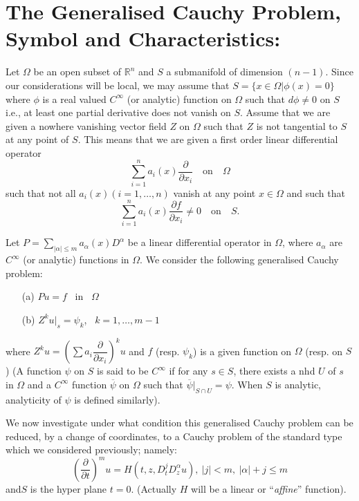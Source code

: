 \section*{The Generalised Cauchy Problem, Symbol and Characteristics:}\pageoriginale

Let $\Omega$ be an open subset of $\mathbb{R}^{n}$ and $S$ a submanifold of dimension $(n-1)$. Since our considerations will be local, we may assume that $S=\{x\in \Omega|\phi(x)=0\}$ where $\phi$ is a real valued $C^{\infty}$ (or analytic) function on $\Omega$ such that $d\phi \neq 0$ on $S$ i.e., at least one partial derivative does not vanish on $S$. Assume that we are given a nowhere vanishing vector field $Z$ on $\Omega$ such that $Z$ is not tangential to $S$ at any point of $S$. This means that we are given a first order linear differential operator
$$
\sum\limits^{n}_{i=1}a_{i}(x)\frac{\partial}{\partial x_{i}}\quad\text{on}\quad \Omega
$$
such that not all $a_{i}(x)(i=1,\ldots,n)$ vanish at any point $x\in \Omega$ and such that
$$
\sum\limits^{n}_{i=1}a_{i}(x)\frac{\partial f}{\partial x_{i}}\neq 0 \quad\text{on}\quad S.
$$

Let $P=\sum\limits_{|\alpha |\leq m}a_{\alpha}(x)D^{\alpha}$ be a linear differential operator in $\Omega$, where $a_{\alpha}$ are $C^{\infty}$ (or analytic) functions in $\Omega$. We consider the following generalised Cauchy problem:
\begin{itemize}
\item[(a)] $Pu=f$ \ in \ $\Omega$

\item[(b)] $Z^{k}u|_{s}=\psi_{k}$, \ $k=1,\ldots,m-1$
\end{itemize}
where $Z^{k}u=\left(\sum a_{i}\dfrac{\partial}{\partial x_{i}}\right)^{k}u$ and $f$ (resp. $\psi_{k}$) is a given function on $\Omega$ (resp. on $S$) (A function $\psi$ on $S$ is said to be $C^{\infty}$ if for any $s\in S$, there exists a nhd $U$ of $s$ in $\Omega$ and a $C^{\infty}$ function $\overline{\psi}$ on $\Omega$ such that $\overline{\psi}|_{S\cap U}=\psi$. When $S$ is analytic, analyticity of $\psi$ is defined similarly).

We now investigate under what condition this generalised Cauchy problem can be reduced, by a change of coordinates, to a Cauchy problem of the standard type which we considered previously; namely:
$$
\left(\frac{\partial}{\partial t}\right)^{m}u=H(t,z,D^{j}_{t}D^{\alpha}_{z}u), \ |j|<m, \ |\alpha |+j\leq m
$$
and\pageoriginale $S$ is the hyper plane $t=0$. (Actually $H$ will be a linear or ``{\em affine}'' function).

